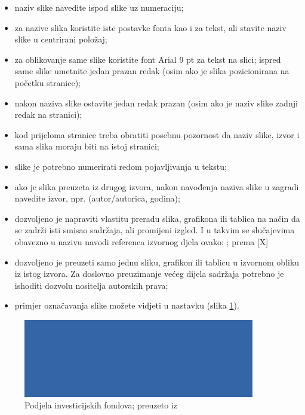 \documentclass[]{foi} %
\begin{document}
\begin{itemize}
	\item naziv slike navedite ispod slike uz numeraciju;

	\item za nazive slika koristite iste postavke fonta kao i za tekst, ali stavite naziv slike u centrirani položaj;

	\item za oblikovanje same slike koristite font Arial 9 pt za tekst na slici;
	      ispred same slike umetnite jedan prazan redak (osim ako je slika pozicionirana na početku stranice);

	\item nakon naziva slike ostavite jedan redak prazan (osim ako je naziv slike zadnji redak na stranici);

	\item kod prijeloma stranice treba obratiti posebnu pozornost da naziv slike, izvor i sama slika moraju biti na istoj stranici;

	\item slike je potrebno numerirati redom pojavljivanja u tekstu;

	\item ako je slika preuzeta iz drugog izvora, nakon navođenja naziva slike u zagradi navedite izvor, npr. (autor/autorica, godina);

	\item dozvoljeno je napraviti vlastitu preradu slika, grafikona ili tablica na način da se zadrži isti smisao sadržaja, ali promijeni izgled. I u takvim se slučajevima obavezno u nazivu navodi referenca izvornog djela ovako: ; prema [X]

	\item dozvoljeno je preuzeti samo jednu sliku, grafikon ili tablicu u izvornom obliku iz istog izvora. Za doslovno preuzimanje većeg dijela sadržaja potrebno je ishoditi dozvolu nositelja autorskih prava;

	\item primjer označavanja slike možete vidjeti u nastavku (slika \ref{fig:podjela}).
\end{itemize}

\begin{figure}[]
	\centering
	\includegraphics[width=0.9\textwidth]{slike/slika.png}
	\caption{Podjela investicijskih fondova; preuzeto iz \cite{Russell2010AImodern}}
	\label{fig:podjela}
\end{figure}
\end{document}
